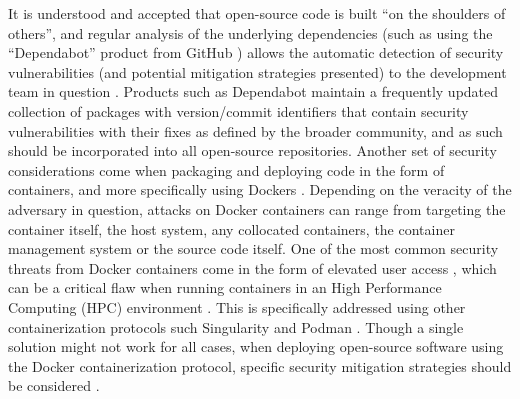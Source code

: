 \documentclass{article}
\begin{document}
It is understood and accepted that open-source code is built “on the shoulders of others”, and regular analysis of the underlying dependencies (such as using the “Dependabot” product from GitHub \cite{noauthor_dependabot_nodate}) allows the automatic detection of security vulnerabilities (and potential mitigation strategies presented) to the development team in question \cite{alfadel_use_2021}. Products such as Dependabot maintain a frequently updated collection of packages with version/commit identifiers that contain security vulnerabilities with their fixes as defined by the broader community, and as such should be incorporated into all open-source repositories. Another set of security considerations come when packaging and deploying code in the form of containers, and more specifically using Dockers \cite{merkel_docker_nodate}. Depending on the veracity of the adversary in question, attacks on Docker containers can range from targeting the container itself, the host system, any collocated containers, the container management system or the source code itself\cite{combe_docker_2016}. One of the most common security threats from Docker containers come in the form of elevated user access \cite{combe_docker_2016, bui_analysis_2015}, which can be a critical flaw when running containers in an High Performance Computing (HPC) environment \cite{sparks_enabling_2019, bacis_dockerpolicymodules_2015}. This is specifically addressed using other containerization protocols such Singularity \cite{kurtzer_singularity_2017} and Podman \cite{gantikow_rootless_2020}. Though a single solution might not work for all cases, when deploying open-source software using the Docker containerization protocol, specific security mitigation strategies should be considered \cite{yasrab_mitigating_2021}.
\makeatother
\end{document}
